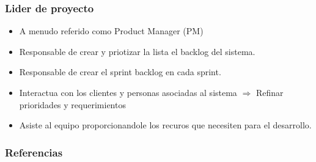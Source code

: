 \documentclass{beamer}
\begin{document}
\begin{frame}
    \frametitle{Lider de proyecto}
    \begin{itemize}
        \item{A menudo referido como Product Manager (PM)}
        \item{Responsable de crear y priotizar la lista el backlog del sistema.}
        \item{Responsable de crear el sprint backlog en cada sprint.}
        \item{Interactua con los clientes y personas asociadas al sistema $\Rightarrow$ Refinar prioridades y requerimientos}
        \item{Asiste al equipo proporcionandole los recuros que necesiten para el desarrollo.}
    \end{itemize}
\end{frame}

\begin{frame}
\frametitle{Referencias}


\end{frame}
\end{document}
